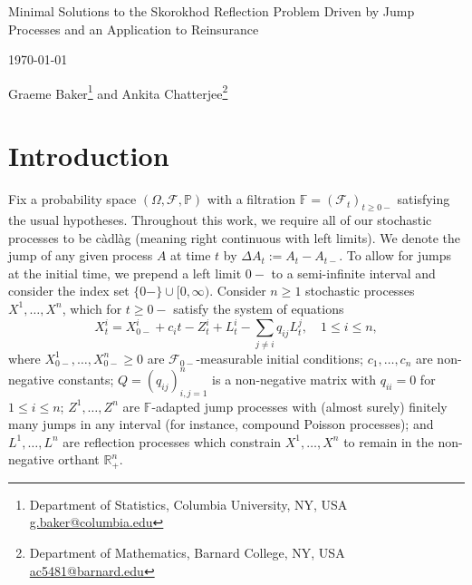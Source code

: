 \documentclass[12pt]{article}
\newcommand{\R}{\mathbb{R}}
\newcommand{\bP}{\mathbb{P}}
\newcommand{\bF}{\mathbb{F}}
\newcommand{\calF}{\mathcal{F}}
\theoremstyle{plain}
\theoremstyle{definition}
\theoremstyle{remark}
\begin{document}
\begin{center}
\Large
Minimal Solutions to the Skorokhod Reflection Problem Driven by Jump Processes and an Application to Reinsurance

\vspace{1em}
\normalsize
\today

\vspace{1em}

Graeme Baker\footnote{Department of Statistics, Columbia University, NY, USA \href{mailto:g.baker@columbia.edu}{g.baker@columbia.edu}} and Ankita Chatterjee\footnote{Department of Mathematics, Barnard College, NY, USA \href{mailto:ac5481@barnard.edu}{ac5481@barnard.edu}} 

\end{center}

\begin{abstract}
We consider a reflected process in the positive orthant driven by an exogenous jump process. For a given input process, we show that there exists a unique minimal strong solution to the given particle system up until a certain stopping time, which is stated explicitly in terms of the dual formulation of a linear programming problem associated with the state of the system. We apply this model to study the ruin time of interconnected insurance firms, where the stopping time can be interpreted as the failure time of a reinsurance agreement between the firms. Our work extends the analysis of the particle system in \cite{baker_particle_2025} to the case of jump driving processes, and the existence result of \cite{reiman_open_1984} beyond the case of sub-stochastic reflection matrices.
\end{abstract}

\section{Introduction}
Fix a probability space $(\Omega,\calF,\bP)$ with a filtration $\bF=(\calF_t)_{t\ge0-}$ satisfying the usual hypotheses. Throughout this work, we require all of our stochastic processes to be c\`adl\`ag (meaning right continuous with left limits). We denote the jump of any given process $A$ at time $t$ by $\Delta A_t:=A_t-A_{t-}$. To allow for jumps at the initial time, we prepend a left limit $0-$ to a semi-infinite interval and consider the index set $\{0-\}\cup[0,\infty)$. Consider $n\ge 1$ stochastic processes $X^1,\dots,X^n$, which for $t\ge 0-$ satisfy the system of equations
\begin{equation}\label{eq:ps}
X_t^i=X_{0-}^i+c_it-Z_t^i+L_t^i-\sum_{j\neq i}q_{ij}L_t^j,\quad 1\le i\le n,
\end{equation}
where $X_{0-}^1,\dots, X_{0-}^n\ge 0$ are $\calF_{0-}$-measurable initial conditions; $c_1,\dots,c_n$ are non-negative constants; $Q=(q_{ij})_{i,j=1}^n$ is a non-negative matrix with $q_{ii}=0$ for $1\le i\le n$; $Z^1,\dots,Z^n$ are $\bF$-adapted jump processes with (almost surely) finitely many jumps in any interval (for instance, compound Poisson processes); and $L^1,\dots,L^n$ are reflection processes which constrain $X^1,\dots,X^n$ to remain in the non-negative orthant $\R^n_+$. 
\end{document}

